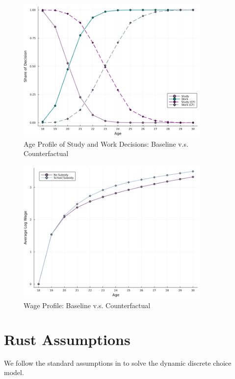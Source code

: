 \documentclass[a4paper, 12pt]{article}
\begin{document}
\begin{figure}[h] 
    \centering
    \includegraphics[width=0.85\textwidth]{decision_by_age_comparison.png}
    \caption{Age Profile of Study and Work Decisions: Baseline v.s. Counterfactual}
    \label{fig:subsidy_effect_on_decision}
\end{figure}

\begin{figure}[h] 
    \centering
    \includegraphics[width=0.85\textwidth]{lifetime_utility.png}
    \caption{Wage Profile: Baseline v.s. Counterfactual}
    \label{fig:wage_profile_comparison}
\end{figure}


\clearpage
\appendix
\section{Rust Assumptions}
We follow the standard assumptions in \cite{rust1987optimal} to solve the dynamic discrete choice model.
\end{document}
